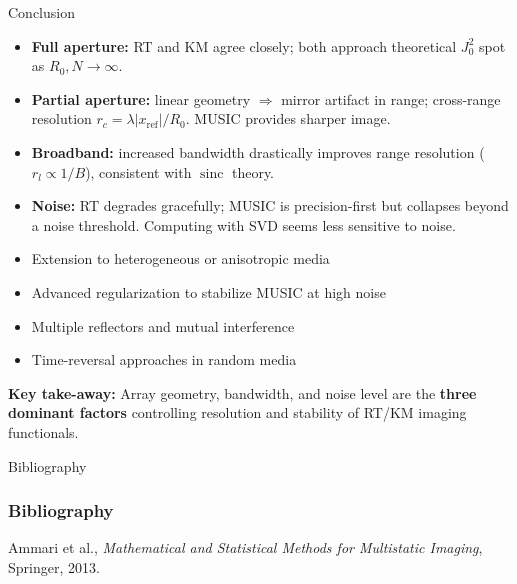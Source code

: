\documentclass{beamer}
\begin{document}
\begin{frame}{Conclusion}
  \scriptsize
  \vspace{-0.1cm}
  \begin{tcolorbox}[keybox, title=Summary of Findings, top=2pt, bottom=2pt]
    \begin{itemize}\setlength\itemsep{1pt}
      \item \textbf{Full aperture:} RT and KM agree closely; both approach theoretical $J_0^2$ spot as $R_0,N\!\to\!\infty$.
      \item \textbf{Partial aperture:} linear geometry $\Rightarrow$ mirror artifact in range; cross-range resolution $r_c\!=\!\lambda|x_{\mathrm{ref}}|/R_0$. MUSIC provides sharper image.
      \item \textbf{Broadband:} increased bandwidth drastically improves range resolution ($r_l \!\propto\! 1/B$), consistent with $\operatorname{sinc}$ theory.
      \item \textbf{Noise:} RT degrades gracefully; MUSIC is precision-first but collapses beyond a noise threshold. Computing with SVD seems less sensitive to noise.
    \end{itemize}
  \end{tcolorbox}


  \begin{tcolorbox}[warnbox, title=Perspectives, top=2pt, bottom=2pt]
    \begin{itemize}\setlength\itemsep{1pt}
      \item Extension to heterogeneous or anisotropic media
      \item Advanced regularization to stabilize MUSIC at high noise
      \item Multiple reflectors and mutual interference
      \item Time-reversal approaches in random media
    \end{itemize}
  \end{tcolorbox}


  \begin{tcolorbox}[keybox, top=2pt, bottom=2pt]
    \textbf{Key take-away:} Array geometry, bandwidth, and noise level are the \textbf{three dominant factors} controlling resolution and stability of RT/KM imaging functionals.
  \end{tcolorbox}
\end{frame}


\begingroup
{}

\begin{frame}[allowframebreaks]{Bibliography}
\frametitle{Bibliography}
Ammari et al., \textit{Mathematical and Statistical Methods for Multistatic Imaging}, Springer, 2013.
\end{frame}
\endgroup
\end{document}
